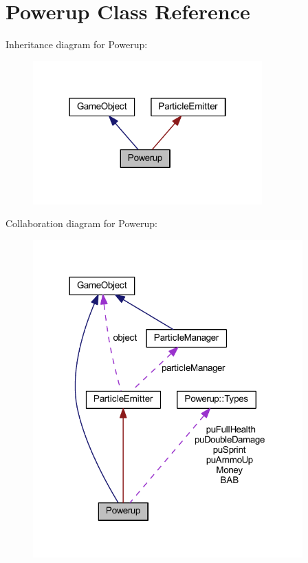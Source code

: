 \hypertarget{class_powerup}{\section{Powerup Class Reference}
\label{class_powerup}
}


Inheritance diagram for Powerup\+:\nopagebreak
\begin{figure}[H]
\begin{center}
\leavevmode
\includegraphics[width=250pt]{class_powerup__inherit__graph}
\end{center}
\end{figure}


Collaboration diagram for Powerup\+:\nopagebreak
\begin{figure}[H]
\begin{center}
\leavevmode
\includegraphics[width=294pt]{class_powerup__coll__graph}
\end{center}
\end{figure}

